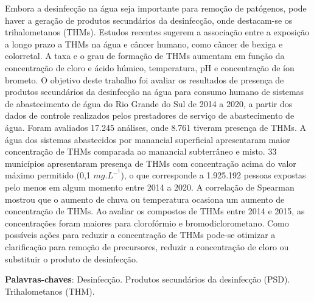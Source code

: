 
\setlength{\absparsep}{18pt} %
\begin{resumo}
	
Embora a desinfecção na água seja importante para remoção de patógenos, pode haver a geração de produtos secundários da desinfecção, onde destacam-se os trihalometanos (THMs). Estudos recentes sugerem a associação entre a exposição a longo prazo a THMs na água e câncer humano, como câncer de bexiga e colorretal. A taxa e o grau de formação de THMs aumentam em função da concentração de cloro e ácido húmico, temperatura, pH e concentração de íon brometo. O objetivo deste trabalho foi avaliar os resultados de presença de produtos secundários da desinfecção na água para consumo humano de sistemas de abastecimento de água do Rio Grande do Sul de 2014 a 2020, a partir dos dados de controle realizados pelos prestadores de serviço de abastecimento de água. Foram avaliados 17.245 análises, onde 8.761 tiveram presença de THMs. A água dos sistemas abastecidos por manancial superficial apresentaram maior concentração de THMs comparada ao manancial subterrâneo e misto. 33 municípios apresentaram presença de THMs com concentração acima do valor máximo permitido (0,1 $mg.L^-^1$), o que corresponde a 1.925.192 pessoas expostas pelo menos em algum momento entre 2014 a 2020. A correlação de Spearman mostrou que o aumento de chuva ou temperatura ocasiona um aumento de concentração de THMs. Ao avaliar os compostos de THMs entre 2014 e 2015, as concentrações foram maiores para clorofórmio e bromodiclorometano. Como possíveis ações para reduzir a concentração de THMs pode-se otimizar a clarificação para remoção de precursores, reduzir a concentração de cloro ou substituir o produto de desinfecção.

 
   
	\vspace{\onelineskip}
 
	\noindent 
	\textbf{Palavras-chaves}: Desinfecção. Produtos secundários da desinfecção (PSD). Trihalometanos (THM). 
\end{resumo}

